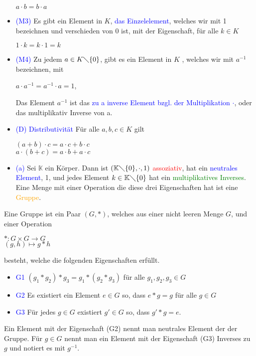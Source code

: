 \begin{definition}
\begin{itemize}
\begin{center}
        $a \cdot b = b \cdot a$
    \end{center}
    \item \textcolor{blue}{(M3)} Es gibt ein Element in $K$, \textcolor{blue}{das Einzelelement}, welches wir mit 1 bezeichnen und verschieden von 0 ist, mit der Eigenschaft, für alle $k \in K$
    \begin{center}
        $1 \cdot k = k \cdot 1 = k$
    \end{center}
    \item \textcolor{blue}{(M4)} Zu jedem $a \in K\diagdown \{0\}$, gibt es ein Element in $K$ , welches wir mit $a^{-1}$ bezeichnen, mit
    \begin{center}
        $a \cdot a^{-1} = a^{-1} \cdot a = 1$,
    \end{center}
    Das Element $a^{-1}$ ist das \textcolor{blue}{zu a inverse Element bzgl. der Multiplikation $\cdot$}, oder das multiplikativ Inverse von a.
    \item \textcolor{blue}{(D) Distributivität} Für alle $a,b,c \in K$ gilt
    \begin{center}
        $(a + b) \cdot c = a \cdot c + b \cdot c$\\
        $a \cdot (b + c) = a \cdot b + a \cdot c$
    \end{center}
\end{itemize}
\end{definition}
\begin{definition}
\begin{itemize}
    \item \textcolor{blue}{(a)} Sei $\mathbb{K}$ ein Körper. Dann ist $(\mathbb{K} \diagdown \{0\}, \cdot, 1)$ \textcolor{red}{assoziativ}, hat ein \textcolor{blue}{neutrales Element}, 1, und jedes Element $k \in \mathbb{K} \diagdown \{0\}$ hat ein \textcolor{green}{multiplikatives Inverses}. Eine Menge mit einer Operation die diese drei Eigenschaften hat ist eine \textcolor{orange}{Gruppe}.
\end{itemize}
\end{definition}
\begin{definition}
Eine Gruppe ist ein Paar $(G, \ast)$, welches aus einer nicht leeren Menge $G$, und einer Operation
\begin{center}
    $\ast : G \times G \rightarrow G$\\
    $(g,h) \mapsto g \ast h$
\end{center}
besteht, welche die folgenden Eigenschaften erfüllt.
\begin{itemize}
    \item \textcolor{blue}{G1} $(g_1 \ast g_2) \ast g_3 = g_1 \ast (g_2 \ast g_3)$ für alle $g_1, g_2, g_3 \in G$
    \item \textcolor{blue}{G2} Es existiert ein Element $e \in G$ so, dass $e \ast g = g$ für alle $g \in G$
    \item \textcolor{blue}{G3} Für jedes $g \in G$ existiert $g' \in G$ so, dass $g' \ast g = e$.
\end{itemize}
Ein Element mit der Eigenschaft (G2) nennt man neutrales Element der der Gruppe. Für $g \in G$ nennt man ein Element mit der Eigenschaft (G3) Inverses zu $g$ und notiert es mit $g^{-1}$.
\end{definition}
